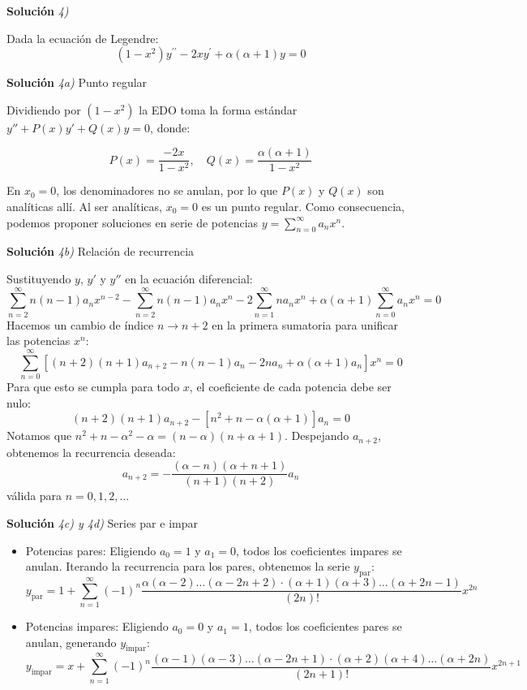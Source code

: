 \documentclass[11pt,spanish]{article}
\begin{document}
\vspace{0.5cm}
{\bf Soluci\'on }{\em 4)}
\vspace{0.5cm}

Dada la ecuación de Legendre:
$$(1-x^{2})y^{\prime\prime}-2xy^{\prime}+\alpha(\alpha+1)y=0$$

\vspace{0.5cm}
{\bf Soluci\'on }{\em 4a)}
Punto regular
\vspace{0.5cm}

Dividiendo por $(1-x^2)$ la EDO toma la forma estándar $y'' + P(x)y' + Q(x)y = 0$, donde:


$$P(x) = \frac{-2x}{1-x^2}, \quad Q(x) = \frac{\alpha(\alpha+1)}{1-x^2}$$

En $x_0=0$, los denominadores no se anulan, por lo que $P(x)$ y $Q(x)$ son analíticas allí. Al ser analíticas, $x_0=0$ es un punto regular. Como consecuencia, podemos proponer soluciones en serie de potencias $y = \sum_{n=0}^{\infty} a_n x^n$.

\vspace{0.5cm}
{\bf Soluci\'on }{\em 4b)}
Relación de recurrencia
\vspace{0.5cm}

Sustituyendo $y$, $y'$ y $y''$ en la ecuación diferencial:
$$\sum_{n=2}^{\infty}n(n-1)a_{n}x^{n-2} - \sum_{n=2}^{\infty}n(n-1)a_{n}x^{n} - 2\sum_{n=1}^{\infty}na_{n}x^{n} + \alpha(\alpha+1)\sum_{n=0}^{\infty}a_{n}x^{n} = 0$$
Hacemos un cambio de índice $n \to n+2$ en la primera sumatoria para unificar las potencias $x^n$:
$$\sum_{n=0}^{\infty} \left[ (n+2)(n+1)a_{n+2} - n(n-1)a_n - 2na_n + \alpha(\alpha+1)a_n \right] x^n = 0$$
Para que esto se cumpla para todo $x$, el coeficiente de cada potencia debe ser nulo:
$$(n+2)(n+1)a_{n+2} - \left[ n^2 + n - \alpha(\alpha+1) \right] a_n = 0$$
Notamos que $n^2 + n - \alpha^2 - \alpha = (n-\alpha)(n+\alpha+1)$. Despejando $a_{n+2}$, obtenemos la recurrencia deseada:
$$a_{n+2} = -\frac{(\alpha-n)(\alpha+n+1)}{(n+1)(n+2)}a_n$$
válida para $n=0, 1, 2, \dots$

\vspace{0.5cm}
{\bf Soluci\'on }{\em 4c) y 4d)}
Series par e impar
\vspace{0.5cm}

\begin{itemize}
\item Potencias pares: Eligiendo $a_0=1$ y $a_1=0$, todos los coeficientes impares se anulan. Iterando la recurrencia para los pares, obtenemos la serie $y_{\text{par}}$:
$$y_{\text{par}}=1+\sum_{n=1}^{\infty}(-1)^{n}\frac{\alpha(\alpha-2)\dots(\alpha-2n+2)\cdot(\alpha+1)(\alpha+3)\dots(\alpha+2n-1)}{(2n)!}x^{2n}$$

\item Potencias impares: 
Eligiendo $a_0=0$ y $a_1=1$, todos los coeficientes pares se anulan, generando $y_{\text{impar}}$:
$$y_{\text{impar}}=x+\sum_{n=1}^{\infty}(-1)^{n}\frac{(\alpha-1)(\alpha-3)\dots(\alpha-2n+1)\cdot(\alpha+2)(\alpha+4)\dots(\alpha+2n)}{(2n+1)!}x^{2n+1}$$
\end{itemize}
\end{document}
